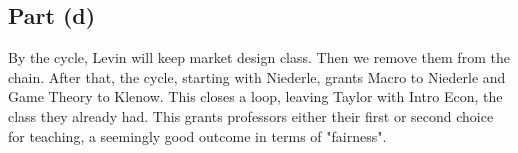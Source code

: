 \documentclass[10pt,a4paper]{article}
\begin{document}
  \subsection*{Part (d)}
    By the cycle, Levin will keep market design class. Then we remove them from the chain. After that, the cycle, starting with Niederle, grants Macro to Niederle and Game Theory to Klenow. This closes a loop, leaving Taylor with Intro Econ, the class they already had. This grants professors either their first or second choice for teaching, a seemingly good outcome in terms of "fairness".
\end{document}
